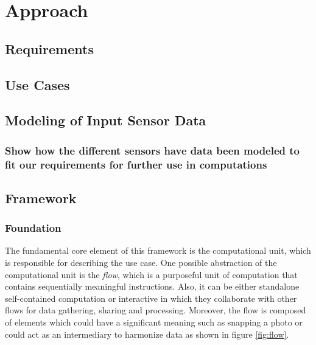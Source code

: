 
\chapter{Approach}\label{chapter:Approach}

\section{Requirements}
\section{Use Cases}
\section{Modeling of Input Sensor Data}
\subsection{Show how the different sensors have data been modeled to fit our requirements for further use in computations}




\newpage

\section{Framework}
\subsection{Foundation}
	The fundamental core element of this framework is the computational unit, which is responsible for describing the use case. One possible abstraction of the computational unit is the \textit{flow}, which is a purposeful unit of computation that contains sequentially meaningful instructions. Also, it can be either standalone self-contained computation or interactive in which they collaborate with other flows for data gathering, sharing and processing. Moreover, the flow is composed of elements which could have a significant meaning such as snapping a photo or could act as an intermediary to harmonize data as shown in figure \ref{fig:flow}. 
	
